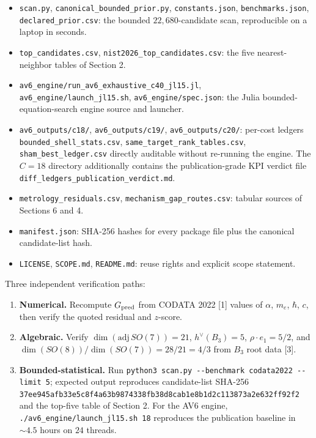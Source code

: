\documentclass[
  11pt,
  letterpaper,
  twocolumn,
]{article}
\providecommand{\tightlist}{%
  \setlength{\itemsep}{0pt}\setlength{\parskip}{0pt}}
\providecommand{\tightlist}{\setlength{\itemsep}{0pt}\setlength{\parskip}{0pt}}
\begin{document}
\begin{itemize}
\tightlist
\item
  \texttt{scan.py}, \texttt{canonical\_bounded\_prior.py},
  \texttt{constants.json}, \texttt{benchmarks.json},
  \texttt{declared\_prior.csv}: the bounded \(22{,}680\)-candidate scan,
  reproducible on a laptop in seconds.
\item
  \texttt{top\_candidates.csv}, \texttt{nist2026\_top\_candidates.csv}:
  the five nearest-neighbor tables of Section 2.
\item
  \texttt{av6\_engine/\allowbreak run\_av6\_\allowbreak exhaustive\_c40\_jl15.jl},
  \texttt{av6\_engine/\allowbreak launch\_jl15.sh},
  \texttt{av6\_engine/\allowbreak spec.json}:
  the Julia bounded-equation-search engine source and launcher.
\item
  \texttt{av6\_outputs/c18/}, \texttt{av6\_outputs/c19/},
  \texttt{av6\_outputs/c20/}: per-cost ledgers
  \texttt{bounded\_shell\_stats.csv},
  \texttt{same\_target\_rank\_tables.csv},
  \texttt{sham\_best\_ledger.csv} directly auditable without re-running
  the engine. The \(C\!=\!18\) directory additionally contains the
  publication-grade KPI verdict file
  \texttt{diff\_ledgers\_publication\_verdict.md}.
\item
  \texttt{metrology\_residuals.csv},
  \texttt{mechanism\_gap\_routes.csv}: tabular sources of Sections 6 and
  4.
\item
  \texttt{manifest.json}: SHA-256 hashes for every package file plus the
  canonical candidate-list hash.
\item
  \texttt{LICENSE}, \texttt{SCOPE.md}, \texttt{README.md}: reuse rights
  and explicit scope statement.
\end{itemize}

Three independent verification paths:

\begin{enumerate}
\def\labelenumi{\arabic{enumi}.}
\tightlist
\item
  \textbf{Numerical.} Recompute \(G_{\rm pred}\) from CODATA 2022
  {[}1{]} values of \(\alpha\), \(m_e\), \(\hbar\), \(c\), then verify
  the quoted residual and \(z\)-score.
\item
  \textbf{Algebraic.} Verify \(\dim(\mathrm{adj}\,SO(7)) = 21\),
  \(h^\vee(B_3) = 5\), \(\rho\!\cdot\!e_1 = 5/2\), and
  \(\dim(SO(8))/\dim(SO(7)) = 28/21 = 4/3\) from \(B_3\) root data
  {[}3{]}.
\item
  \textbf{Bounded-statistical.} Run
  \texttt{python3\ scan.py\ -\/-benchmark\ codata2022\ -\/-limit\ 5};
  expected output reproduces candidate-list SHA-256
  \texttt{37ee945afb33e5c8f4a63b9874338fb3\allowbreak 8d8cab1e8b1d2c113873a2e632ff92f2}
  and the top-five table of Section 2. For the AV6 engine,
  \texttt{./av6\_engine/launch\_jl15.sh\ 18} reproduces the publication
  baseline in \(\sim\!4.5\) hours on \(24\) threads.
\end{enumerate}
\end{document}
